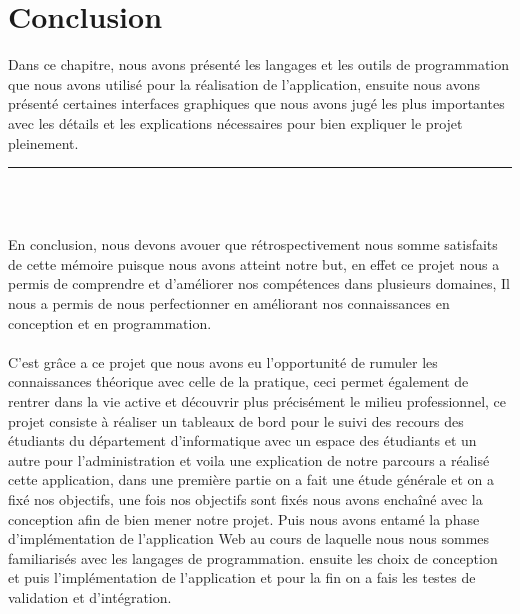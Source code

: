 \documentclass[12pt]{report}
\begin{document}
\section{Conclusion}
\vspace{0.1in}

Dans ce chapitre, nous avons présenté les langages et les outils de programmation que nous avons utilisé pour la réalisation de l'application, ensuite nous avons présenté certaines interfaces graphiques que nous avons jugé les plus importantes avec les détails et les explications nécessaires pour bien expliquer le projet pleinement.

\newpage

\vspace*{-0.2in}

\begin{center}
    {\color{Blue} \rule{5.5in}{1.4mm} }\\
    \vspace{0.1in}
    \scshape{\fontsize{34}{46}{\bfseries{\color{Blue}{Conclusion générale}}}}
    \\
    \vspace{0.5in}
\end{center}

En conclusion, nous devons avouer que rétrospectivement nous somme satisfaits de cette mémoire puisque nous avons atteint notre but, en effet ce projet nous a permis de comprendre et d'améliorer nos compétences dans plusieurs domaines, Il nous a permis de nous perfectionner en améliorant nos connaissances en conception et en programmation.
\\\\
    C'est grâce a ce projet que nous avons eu l'opportunité de rumuler les connaissances théorique avec celle de la pratique, ceci permet également de rentrer dans la vie active et découvrir plus précisément le milieu professionnel, ce projet consiste à réaliser un tableaux de bord pour le suivi des recours des étudiants du département d’informatique avec un espace des étudiants et un autre pour l’administration et voila une explication de notre parcours a réalisé cette application, dans une première partie on a fait une étude générale et on a fixé nos objectifs, une fois nos objectifs sont fixés nous avons enchaîné avec la conception afin de bien mener notre projet. Puis nous avons entamé la phase d’implémentation de l’application Web au cours de laquelle nous nous sommes familiarisés avec les langages de programmation. ensuite les choix de conception et puis l'impl\'ementation de l’application et pour la fin on a fais les testes de validation et d'intégration.
\end{document}
